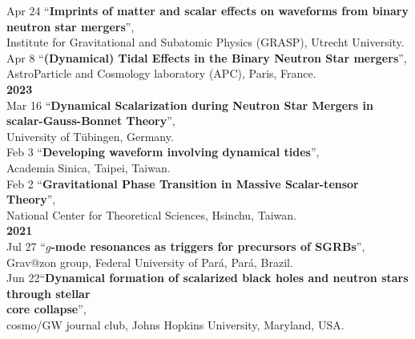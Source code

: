 \documentclass[10pt,floatfix,a4paper]{article}
\begin{document}
\begin{tabbing}
  \> Apr 24 \> ``\textbf{Imprints of matter and scalar effects on waveforms from binary neutron star mergers}'',\\
  \> \>  Institute for Gravitational and Subatomic Physics (GRASP), Utrecht University.\\
  \> Apr 8 \> ``\textbf{(Dynamical) Tidal Effects in the Binary Neutron Star mergers}'',\\
  \> \> AstroParticle and Cosmology laboratory (APC), Paris, France. \\
  \> \textbf{2023} \> \\[1ex]
  \> Mar 16 \> ``\textbf{Dynamical Scalarization during Neutron Star Mergers in scalar-Gauss-Bonnet Theory}'', \\
  \> \> University of T{\"u}bingen, Germany.\\
  \> Feb 3 \> ``\textbf{Developing waveform involving dynamical tides}'', \\
  \> \> Academia Sinica, Taipei, Taiwan.\\
  \> Feb 2 \> ``\textbf{Gravitational Phase Transition in
  Massive Scalar-tensor Theory}'', \\
  \> \> National Center for Theoretical Sciences, Hsinchu, Taiwan.\\
  \> \textbf{2021} \> \\[1ex]
  \> Jul 27 \>``\textbf{$g$-mode resonances as triggers for precursors of SGRBs}'', \\ 
  \> \> Grav@zon group, Federal University of Pará, Pará, Brazil. \\
  \> Jun 22\>``\textbf{Dynamical formation of scalarized black holes and neutron stars through stellar}\\
  \> \> \textbf{core collapse}'', \\ 
  \> \> cosmo/GW journal club, Johns Hopkins University, Maryland, USA.
\end{tabbing}
\end{document}
